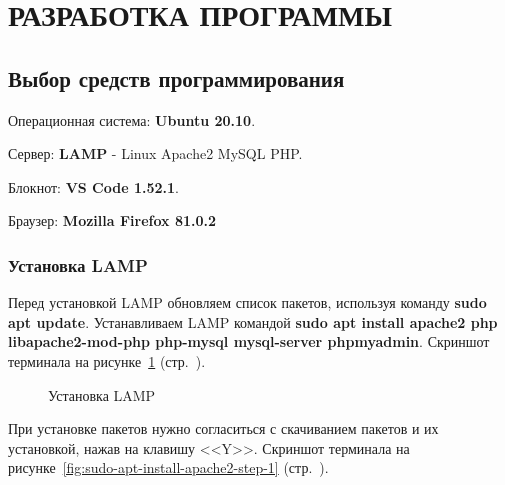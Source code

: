 \newpage

\section{РАЗРАБОТКА ПРОГРАММЫ}

\subsection{Выбор средств программирования}

Операционная система: \textbf{Ubuntu 20.10}.

Сервер: \textbf{LAMP} - Linux Apache2 MySQL PHP.

Блокнот: \textbf{VS Code 1.52.1}.

Браузер: \textbf{Mozilla Firefox 81.0.2}

\subsubsection{Установка LAMP}

Перед установкой LAMP обновляем список пакетов, используя команду \textbf{sudo apt update}. Устанавливаем LAMP командой \textbf{sudo apt install apache2 php libapache2-mod-php php-mysql mysql-server phpmyadmin}.
Скриншот терминала на рисунке~\ref{fig:sudo-apt-install-apache2} (стр.~\pageref{fig:sudo-apt-install-apache2}).

\begin{figure}[p]
    \caption{Установка LAMP}
    \label{fig:sudo-apt-install-apache2}
\end{figure}

При установке пакетов нужно согласиться с скачиванием пакетов и их установкой, нажав на клавишу <<Y>>.
Скриншот терминала на рисунке~\ref{fig:sudo-apt-install-apache2-step-1} (стр.~\pageref{fig:sudo-apt-install-apache2-step-1}).

